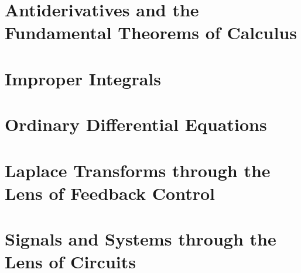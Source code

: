 \documentclass[letterpaper]{book}
\begin{document}
\chapter{Antiderivatives and the Fundamental Theorems of Calculus}
\label{chap:AntiDerivFundThmCalc}


\chapter{Improper Integrals}
\label{chap:ImproperIntegrals}


\chapter{Ordinary Differential Equations}
\label{chap:ODEs}


\chapter{Laplace Transforms through the Lens of Feedback Control}
\label{chap:LaplaceTransformFeedbackControl}



\chapter{Signals and Systems through the Lens of Circuits}
\label{chap:SignalsSystems}





\pagestyle{plain}


% 


\end{document}
